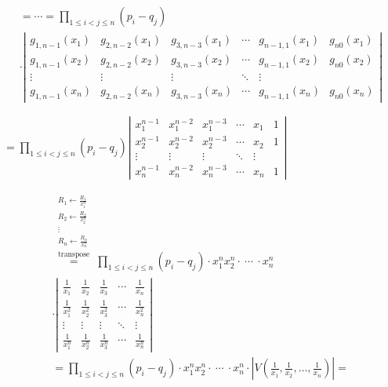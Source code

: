 \documentclass{article}
\begin{document}
\begin{multline*}
= \cdots = \prod_{1 \leq i < j \leq n} (p_{i} - q_{j}) \\
\cdot \left|\begin{matrix}g_{1,n-1}(x_{1}) & g_{2,n-2}(x_{1}) & g_{3,n-3}(x_{1}) & \cdots & g_{n-1,1}(x_{1}) & g_{n0}(x_{1}) \\ g_{1,n-1}(x_{2}) & g_{2,n-2}(x_{2}) & g_{3,n-3}(x_{2}) & \cdots & g_{n-1,1}(x_{2}) & g_{n0}(x_{2}) \\ \vdots & \vdots & \vdots & \ddots & \vdots \\ g_{1,n-1}(x_{n}) & g_{2,n-2}(x_{n}) & g_{3,n-3}(x_{n}) & \cdots & g_{n-1,1}(x_{n}) & g_{n0}(x_{n}) \end{matrix}\right|
\end{multline*}

\( = \prod_{1 \leq i < j \leq n} (p_{i} - q_{j}) \left|\begin{matrix}x_{1}^{n-1} & x_{1}^{n-2} & x_{1}^{n-3} & \cdots & x_{1} & 1 \\ x_{2}^{n-1} & x_{2}^{n-2} & x_{2}^{n-3} & \cdots & x_{2} & 1 \\ \vdots & \vdots & \vdots & \ddots & \vdots \\ x_{n}^{n-1} & x_{n}^{n-2} & x_{n}^{n-3} & \cdots & x_{n} & 1 \end{matrix}\right| \)

\begin{multline*}
\overset{\substack{R_{1} \leftarrow \frac{R_{1}}{x_{1}^{n}}\\ R_{2} \leftarrow \frac{R_{2}}{x_{2}^{n}}\\ \vdots \\ R_{n} \leftarrow \frac{R_{n}}{x_{n}^{n}} \\ \textrm{transpose}}}{=} \prod_{1 \leq i < j \leq n} (p_{i} - q_{j}) \cdot x_{1}^{n}x_{2}^{n} \cdot\ \cdots\ \cdot  x_{n}^{n} \\
\cdot \left|\begin{matrix}\frac{1}{x_{1}} & \frac{1}{x_{2}} & \frac{1}{x_{3}} & \cdots & \frac{1}{x_{n}} \\ \frac{1}{x_{1}^{2}} & \frac{1}{x_{2}^{2}} & \frac{1}{x_{3}^{2}} & \cdots & \frac{1}{x_{n}^{2}} \\ \vdots & \vdots & \vdots & \ddots & \vdots \\ \frac{1}{x_{1}^{n}} & \frac{1}{x_{2}^{n}} & \frac{1}{x_{3}^{n}} & \cdots & \frac{1}{x_{n}^{n}}\end{matrix}\right| \\
= \prod_{1 \leq i < j \leq n} (p_{i} - q_{j}) \cdot x_{1}^{n}x_{2}^{n} \cdot\ \cdots\ \cdot x_{n}^{n} \cdot |V(\frac{1}{x_{1}}, \frac{1}{x_{2}}, \ldots, \frac{1}{x_{n}})| =
\end{multline*}
\end{document}
